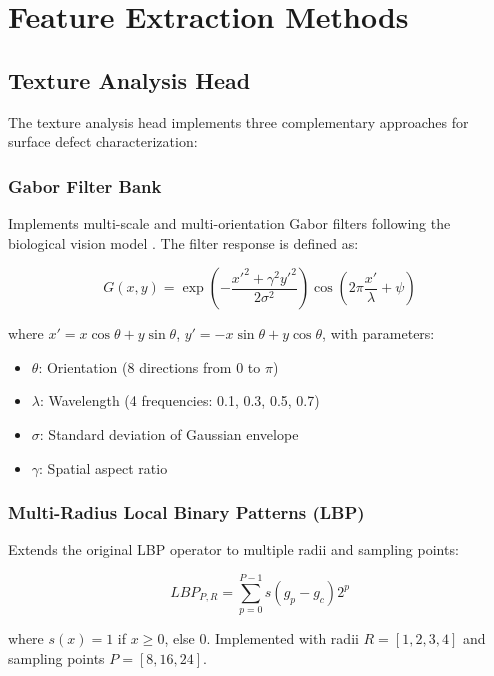 \documentclass[12pt,a4paper]{article}
\begin{document}
\section{Feature Extraction Methods}

\subsection{Texture Analysis Head}

The texture analysis head implements three complementary approaches for surface defect characterization:

\subsubsection{Gabor Filter Bank}
Implements multi-scale and multi-orientation Gabor filters following the biological vision model \cite{daugman1985uncertainty}. The filter response is defined as:

\begin{equation}
G(x,y) = \exp\left(-\frac{x'^2 + \gamma^2 y'^2}{2\sigma^2}\right) \cos\left(2\pi\frac{x'}{\lambda} + \psi\right)
\end{equation}

where $x' = x\cos\theta + y\sin\theta$, $y' = -x\sin\theta + y\cos\theta$, with parameters:
\begin{itemize}
    \item $\theta$: Orientation (8 directions from $0$ to $\pi$)
    \item $\lambda$: Wavelength (4 frequencies: 0.1, 0.3, 0.5, 0.7)
    \item $\sigma$: Standard deviation of Gaussian envelope
    \item $\gamma$: Spatial aspect ratio
\end{itemize}

\subsubsection{Multi-Radius Local Binary Patterns (LBP)}
Extends the original LBP operator \cite{ojala2002multiresolution} to multiple radii and sampling points:

\begin{equation}
LBP_{P,R} = \sum_{p=0}^{P-1} s(g_p - g_c)2^p
\end{equation}

where $s(x) = 1$ if $x \geq 0$, else $0$. Implemented with radii $R = [1,2,3,4]$ and sampling points $P = [8,16,24]$.
\end{document}
